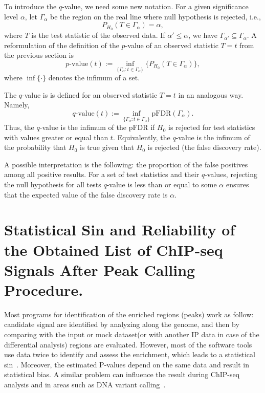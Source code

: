 To introduce the $q$-value, we need some new notation.
For a given significance level $\alpha$, let $\Gamma_\alpha$ be the region on the real line where null hypothesis is rejected, i.e.,
$$P_{H_0}(T \in \Gamma_\alpha) = \alpha,$$
where $T$ is the test statistic of the observed data.
If $\alpha' \leq \alpha$, we have $\Gamma_{\alpha'} \subseteq \Gamma_\alpha$.
A reformulation of the definition of the $p$-value of an observed statistic $T = t$ from the previous section is
$$\text{$p$-value}(t) := \inf_{\{\Gamma_\alpha : t \in \Gamma_\alpha\}}\{P_{H_0}(T \in \Gamma_\alpha)\},$$
where $\inf\{\cdot\}$ denotes the infimum of a set.

The $q$-value is is defined for an observed statistic $T = t$ in an analogous way.
Namely,
$$\text{$q$-value}(t) := \inf_{\{\Gamma_\alpha : t \in \Gamma_\alpha\}}\text{pFDR}(\Gamma_\alpha).$$
Thus, the $q$-value is the infimum of the $\text{pFDR}$ if $H_0$ is rejected for test statistics with values greater or equal than $t$.
Equivalently, the $q$-value is the infimum of the probability that $H_0$ is true given that $H_0$ is rejected (the false discovery rate).

A possible interpretation is the following: the proportion of the false positives among all positive results.
For a set of test statistics and their $q$-values, rejecting the null hypothesis for all tests $q$-value is less than or equal to some $\alpha$ ensures that the expected value of the false discovery rate is $\alpha$.












\section{Statistical Sin and Reliability of the Obtained List of ChIP-seq Signals After Peak Calling Procedure.}

Most programs for identification of the enriched regions (peaks) work as follow: candidate signal are identified by analyzing along the genome, and then by comparing with the input or mock dataset(or with another IP data in case of the differential analysis) regions are evaluated. 
However, most of the software tools use data twice to identify and assess the enrichment, which leads to a statistical sin~\cite{lun2014novo}. 
Moreover, the estimated P-values depend on the same data and result in statistical bias.
A similar problem can influence the result during ChIP-seq analysis and in areas such as DNA variant calling~\cite{chitpin2019recap}.

